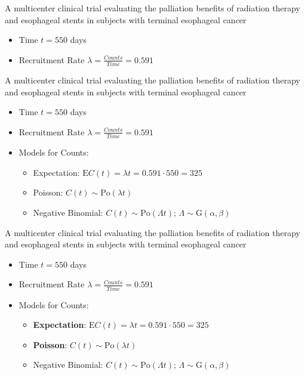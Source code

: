 \documentclass[english]{beamer}\usepackage[]{graphicx}\usepackage[]{xcolor}
\begin{document}
\begin{frame}{A multicenter clinical trial evaluating the palliation benefits of radiation therapy and esophageal stents in subjects with terminal esophageal cancer}

\begin{itemize}
\item Time $t = 550$ days
\item Recruitment Rate $\lambda = \frac{Counts}{Time} = 0.591$ \citep{piantadosi2024clinical}
\end{itemize}

\end{frame}


\begin{frame}{A multicenter clinical trial evaluating the palliation benefits of radiation therapy and esophageal stents in subjects with terminal esophageal cancer}

\begin{itemize}
\item Time $t = 550$ days
\item Recruitment Rate $\lambda = \frac{Counts}{Time} = 0.591$
\item Models for Counts:
	\begin{itemize}
	\item Expectation: $\textrm{E}C(t) = \lambda t = 0.591 \cdot 550 = 325$
	\item Poisson: $C(t) \sim \textrm{Po}(\lambda t)$
	\item Negative Binomial: $C(t) \sim \textrm{Po} (\Lambda t)$; $\Lambda \sim \textrm{G}(\alpha,\beta)$
	\end{itemize}
\end{itemize}

\end{frame}

\begin{frame}{A multicenter clinical trial evaluating the palliation benefits of radiation therapy and esophageal stents in subjects with terminal esophageal cancer}
\begin{itemize}
\item Time $t = 550$ days
\item Recruitment Rate $\lambda = \frac{Counts}{Time} = 0.591$
\item Models for Counts:
	\begin{itemize}
	\item \textbf{Expectation}: $\textrm{E}C(t) = \lambda t = 0.591 \cdot 550 = 325$
	\item \textbf{Poisson}: $C(t) \sim \textrm{Po}(\lambda t)$
	\item Negative Binomial: $C(t) \sim \textrm{Po} (\Lambda t)$; $\Lambda \sim \textrm{G}(\alpha,\beta)$
	\end{itemize}
\end{itemize}
\end{frame}
\end{document}
